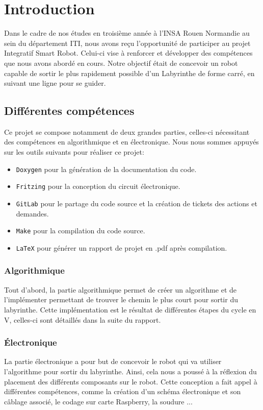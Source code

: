 \chapter{Introduction}
\newcommand{\ordre}{\textbf{Ordre}}
\newcommand{\direction}{\textbf{Direction}}
\newcommand{\nnn}{\textbf{NaturelNonNul}}
\newcommand{\Labyrinthe}{\textbf{Labyrinthe}}
\newcommand{\cdc}{\textbf{ChaineDeCaracteres}}

Dans le cadre de nos études en troisième année à l'INSA Rouen Normandie au sein du département ITI, nous avons reçu l'opportunité de participer au projet Integratif Smart Robot. Celui-ci vise à renforcer et développer des compétences que nous avons abordé en cours. Notre objectif était de concevoir un robot capable de sortir le plus rapidement possible d’un Labyrinthe de forme carré, en suivant une ligne pour se guider.

\section{Différentes compétences}
Ce projet se compose notamment de deux grandes parties, celles-ci nécessitant des compétences en algorithmique et en électronique.
Nous nous sommes appuyés sur les outils suivants pour réaliser ce projet:
\begin{itemize}
    \item \texttt{Doxygen} pour la génération de la documentation du code.
    \item \texttt{Fritzing} pour la conception du circuit électronique.
    \item \texttt{GitLab} pour le partage du code source et la création de tickets des actions et demandes.
    \item \texttt{Make} pour la compilation du code source.
    \item \texttt{LaTeX} pour générer un rapport de projet en .pdf après compilation.
\end{itemize}
\subsection{Algorithmique}
Tout d'abord, la partie algorithmique permet de créer un algorithme et de l'implémenter permettant de trouver le chemin le plus court pour sortir du labyrinthe. Cette implémentation est le résultat de différentes étapes du cycle en V, celles-ci sont détaillés dans la suite du rapport.
\subsection{Électronique}
La partie électronique a pour but de concevoir le robot qui va utiliser l'algorithme pour sortir du labyrinthe. Ainsi, cela nous a poussé à la réflexion du placement des différents composants sur le robot. Cette conception a fait appel à différentes compétences, comme la création d'un schéma électronique et son câblage associé, le codage sur carte Raspberry, la soudure ...
\vspace{5mm}

